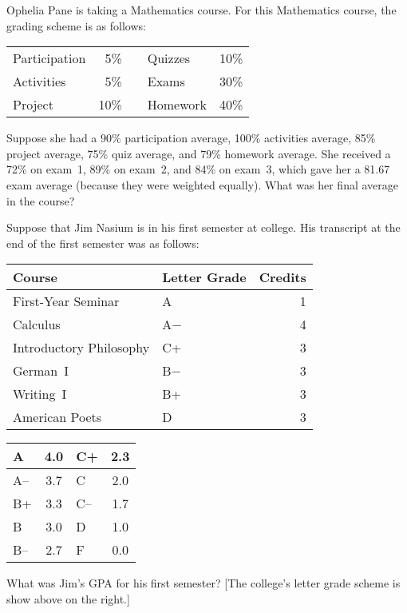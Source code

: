 \documentclass[11pt,letterpaper]{article}
\begin{document}
 Ophelia Pane is taking a Mathematics course. For this Mathematics course, the grading scheme is as follows:
	\begin{table}[!ht]
	\centering
	\begin{tabular}{lrclr}
	Participation & 5\% & \hspace{1.5cm} & Quizzes & 10\% \\
	Activities & 5\% & & Exams & 30\% \\
	Project & 10\% & & Homework & 40\%
	\end{tabular}
	\end{table} \par
Suppose she had a 90\% participation average, 100\% activities average, 85\% project average, 75\% quiz average, and 79\% homework average. She received a 72\% on exam~1, 89\% on exam~2, and 84\% on exam~3, which gave her a 81.67 exam average (because they were weighted equally). What was her final average in the course?



\newpage



 Suppose that Jim Nasium is in his first semester at college. His transcript at the end of the first semester was as follows: \par
	\begin{table}[!ht]
	\centering
	\begin{tabular}{llr}
	Course & Letter Grade & Credits \\ \hline
	First-Year Seminar & A & 1 \\
	Calculus & A$-$ & 4 \\
	Introductory Philosophy & C+ & 3 \\
	German~I & B$-$ & 3 \\
	Writing~I & B+ & 3 \\
	American Poets & D & 3
	\end{tabular} \hspace{1cm}
        \begin{tabular}{|l||c|l||c|} \hline
        A & 4.0 & C+ & 2.3 \\ \hline
        A-- & 3.7 & C & 2.0 \\ \hline
        B+ & 3.3 & C-- & 1.7 \\ \hline
        B & 3.0 & D & 1.0 \\ \hline
        B-- & 2.7 & F & 0.0 \\ \hline
        \end{tabular}
	\end{table} \par
What was Jim's GPA for his first semester? [The college's letter grade scheme is show above on the right.]
\end{document}
